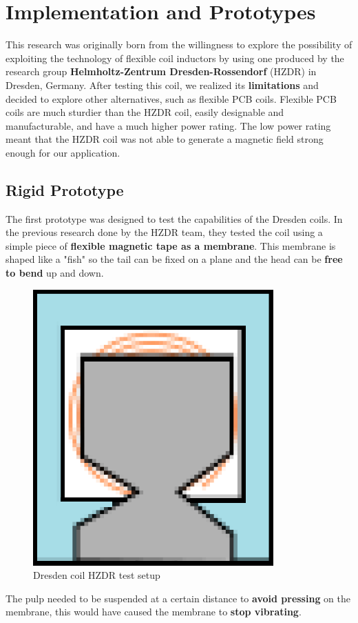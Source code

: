 \section{Implementation and Prototypes}
This research was originally born from the willingness to explore the possibility of exploiting the technology of flexible coil inductors by using one produced by the research group \textbf{Helmholtz-Zentrum Dresden-Rossendorf} (HZDR) in Dresden, Germany.
After testing this coil, we realized its \textbf{limitations} and decided to explore other alternatives, such as flexible PCB coils.
Flexible PCB coils are much sturdier than the HZDR coil, easily designable and manufacturable, and have a much higher power rating.
The low power rating meant that the HZDR coil was not able to generate a magnetic field strong enough for our application.

\subsection{Rigid Prototype}
The first prototype was designed to test the capabilities of the Dresden coils.
In the previous research done by the HZDR team, they tested the coil using a simple piece of \textbf{flexible magnetic tape as a membrane}.
This membrane is shaped like a "fish" so the tail can be fixed on a plane and the head can be \textbf{free to bend} up and down.
\begin{figure}[H]
    \centering
    \includegraphics[width = 0.2\linewidth]{Figures/Dresden_test.png}
    \caption{Dresden coil HZDR test setup}
    \label{fig: Dresden_test}
\end{figure}
The pulp needed to be suspended at a certain distance to \textbf{avoid pressing} on the membrane, this would have caused the membrane to \textbf{stop vibrating}.


